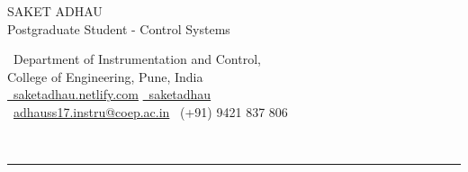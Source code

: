 \documentclass[11pt]{resume}
\newcommand{\makeheading}[2][]%
{\hspace*{-\marginparsep minus \marginparwidth}%
	\begin{minipage}[t]{\textwidth+\marginparwidth+\marginparsep}%
		{\large \bfseries #2 \hfill #1}\\[-0.15\baselineskip]%
		\rule{\columnwidth}{0pt}%
\end{minipage}}
\providecommand*\email[1]{\href{mailto:#1}{#1}}
\begin{document}
	\makeheading{    
		\begin{center}
			\LARGE{SAKET ADHAU \\ \small{Postgraduate Student - Control Systems}} 
		\end{center}
		\newlength{\rcollength}\setlength{\rcollength}{2.35in}%
\begin{center}
	\normalsize{\textnormal{
			\Letter~Department of Instrumentation and Control,\\ College of Engineering, Pune, India\\				
			\href{https://saketadhau.netlify.com/} 
			{\Mundus~saketadhau.netlify.com}
			\href{https://www.linkedin.com/in/saketadhau/} 
			{\faLinkedinSquare~saketadhau}  \\
			\Email~{\email{adhauss17.instru@coep.ac.in}}
			\Mobilefone~(+91) 9421 837 806}}\vspace{-8mm}
\end{center}
	}\vspace{-2mm}
\end{document}
